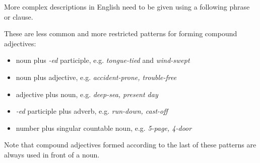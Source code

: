 \documentclass[oneside]{book}
\numberwithin{equation}{section}
\begin{document}
More complex descriptions in English need to be given using a following phrase or clause.

%
\noindent{} These are less common and more restricted patterns for forming compound adjectives:
\begin{itemize}
    \item noun plus \textit{-ed} participle, e.g. \textit{tongue-tied} and \textit{wind-swept}
    \item noun plus adjective, e.g. \textit{accident-prone, trouble-free}
    \item adjective plus noun, e.g. \textit{deep-sea, present day}
    \item \textit{-ed} participle plus adverb, e.g. \textit{run-down, cast-off}
    \item number plus singular countable noun, e.g. \textit{5-page, 4-door}
\end{itemize}
Note that compound adjectives formed according to the last of these patterns are always used in front of a noun.
\end{document}
